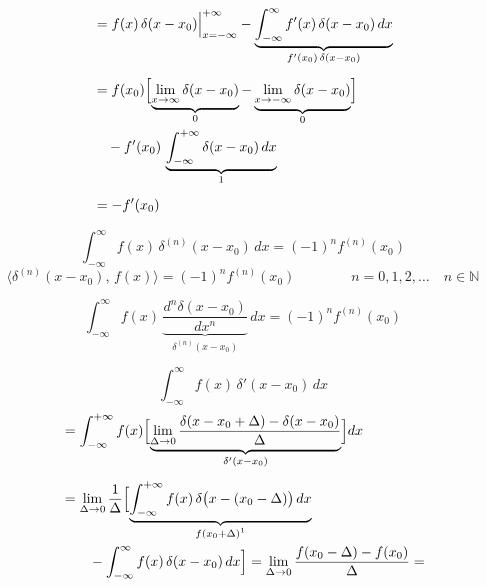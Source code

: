 \documentclass[11pt,a4paper]{article}
\begin{document}
\begin{align*}
&= f(x)\,\delta(x-x_0)\Big|_{x=-\infty}^{+\infty} - \underbrace{\int_{-\infty}^{\infty} f'(x)\,\delta(x-x_0)\,dx}_{f'(x_0)\,\delta(x-x_0)} \\[2mm]
&= f(x_0)\Bigl[\underbrace{\lim_{x\to\infty}\delta(x-x_0)}_{0} - \underbrace{\lim_{x\to-\infty}\delta(x-x_0)}_{0}\Bigr] \\
&\quad - f'(x_0)\,\underbrace{\int_{-\infty}^{+\infty}\delta(x-x_0)\,dx}_{1} \\[2mm]
&= -f'(x_0)
\end{align*}

\begin{center}
\end{center}

\[ \int_{-\infty}^{\infty} f(x)\,\delta^{(n)}(x-x_0)\,dx = (-1)^n f^{(n)}(x_0) \]
\[ \langle \delta^{(n)}(x-x_0),\,f(x)\rangle = (-1)^n f^{(n)}(x_0) \qquad\qquad n=0,1,2,\ldots \quad n\in\mathbb{N} \]

\[ \int_{-\infty}^{\infty} f(x)\,\underbrace{\frac{d^{n}\delta(x-x_0)}{dx^{n}}}_{\delta^{(n)}(x-x_0)}\,dx = (-1)^n f^{(n)}(x_0) \]

\[ \int_{-\infty}^{\infty} f(x)\,\delta'(x-x_0)\,dx \]
\begin{align*}
&= \int_{-\infty}^{+\infty} f(x)\Bigl[\underbrace{\lim_{\Delta\to 0}\frac{\delta(x-x_0+\Delta)-\delta(x-x_0)}{\Delta}}_{\delta'(x-x_0)}\Bigr]dx \\[2mm]
&= \lim_{\Delta\to 0}\frac{1}{\Delta}\Bigl[\underbrace{\int_{-\infty}^{+\infty} f(x)\,\delta\bigl(x-(x_0-\Delta)\bigr)\,dx}_{f(x_0+\Delta)\text{\footnotemark}} \\
&\qquad - \int_{-\infty}^{\infty} f(x)\,\delta(x-x_0)\,dx\Bigr] = \lim_{\Delta\to 0}\frac{f(x_0-\Delta)-f(x_0)}{\Delta} =
\end{align*}

\end{document}
